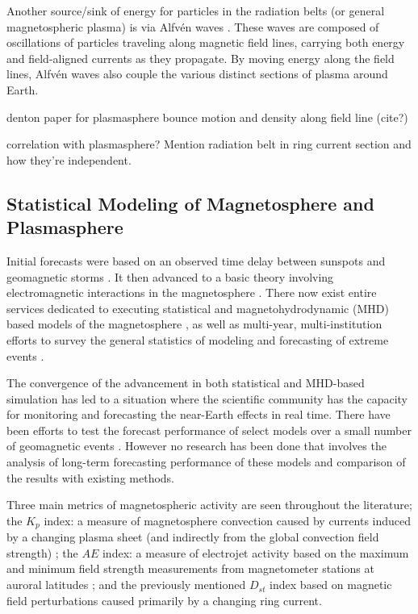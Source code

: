 Another source/sink of energy for particles in the radiation belts (or general magnetospheric plasma) is via Alfvén waves \citep{Keling2009AlfvenWaves}. These waves are composed of oscillations of particles  traveling along magnetic field lines, carrying both energy and field-aligned currents as they propagate. By moving energy along the field lines, Alfvén waves also couple the various distinct sections of plasma around Earth. 

\vnote denton paper for plasmasphere bounce motion \citep{Young2008MagneticFieldLineCurvature} and density along field line (cite?)

\vnote correlation with plasmasphere? Mention radiation belt in ring current section and how they're independent. 

\subsection{Statistical Modeling of Magnetosphere and Plasmasphere}

Initial forecasts  were based on an observed time delay between sunspots and geomagnetic storms \citep{SunspotStorms}. It  then advanced to a basic theory involving electromagnetic interactions in the magnetosphere \citep{Chapman}. There now exist entire services dedicated to executing statistical and magnetohydrodynamic (MHD) based models of the magnetosphere \citep{CCMC}, as well as multi-year, multi-institution efforts to survey the general statistics of modeling and forecasting of extreme events \citep{ExtremeEvents}.

The convergence of the advancement in both statistical and MHD-based simulation has led to a situation where the scientific community has the capacity for monitoring and forecasting the near-Earth effects in real time.  There have been efforts to test the forecast performance of select models over a small number of geomagnetic events \citep{ANNforecast,StormModel,StatCompStorms,Yermolaev} . However no research has been done that involves the analysis of long-term forecasting performance of these models and comparison of the results with existing methods.

Three main metrics of magnetospheric activity are seen throughout the literature; the $K_p$ index: a measure of magnetosphere convection caused by currents induced by a changing plasma sheet (and indirectly from the global convection field strength) \citep{Thomsen2004WhyKpSoGood}; the $AE$ index: a measure of electrojet activity based on the maximum and minimum field strength measurements from magnetometer stations at auroral latitudes \citep{DavisSugiura1966AE}; and the previously mentioned $D_{st}$ index based on magnetic field perturbations caused primarily by a changing ring current.

